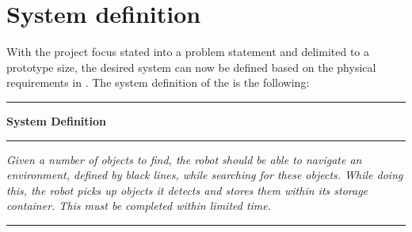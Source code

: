 \section{System definition} \label{sec:system_definition}

With the project focus stated into a problem statement and delimited to a prototype size, the desired system can now be defined based on the physical requirements in . The system definition of the \projname{} is the following:

\begin{table}[H]
	\centering
	\begin{narrow}{1cm}{1cm}

	\rule{\linewidth}{0.035cm}
	\begin{center}
	\textbf{System Definition} 
	\end{center}
	\rule{\linewidth}{0.035cm}
    
	\medskip\noindent \textit{Given a number of objects to find, the robot should be able to navigate an environment, defined by black lines, while searching for these objects. While doing this, the robot picks up objects it detects and stores them within its storage container. This must be completed within limited time.}

	\rule{\linewidth}{0.035cm}
    \label{sec:systemdefinition}
	\end{narrow}
\end{table}

